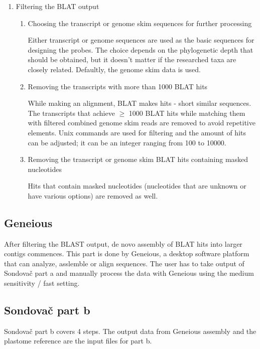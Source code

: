 \begin{enumerate}
\begin{enumerate}
\item Filtering the BLAT output

\begin{enumerate}
\item Choosing the transcript or genome skim sequences for further processing

Either transcript or genome sequences are used as the basic sequences for designing the probes. The choice depends on the phylogenetic depth that should be obtained, but it doesn't 
matter if the researched taxa are closely related. Defaultly, the genome skim data is used. 

\item Removing the transcripts with more than 1000 BLAT hits

While making an alignment, BLAT makes hits - short similar sequences. The transcripts that achieve $\geq$ 1000 BLAT hits while matching them with filtered 
combined genome skim reads are removed to avoid repetitive elements. Unix commands are used for filtering and the amount of hits can be adjusted; it can be an 
integer ranging from 100 to 10000. 

\item Removing the transcript or genome skim BLAT hits containing masked nucleotides

Hits that contain masked nucleotides (nucleotides that are unknown or have various options) are removed as well. 

\end{enumerate}
\end{enumerate}


\subsection{Geneious}

After filtering the BLAST output, de novo assembly of BLAT hits into larger contigs commences. This part is done by Geneious, a desktop software platform 
that can analyze, asslemble or align sequences. The user has to take output of Sondovač part a and manually process the data with Geneious using the medium 
sensitivity / fast setting. 

\subsection{Sondovač part b}
Sondovač part b covers 4 steps. The output data from Geneious assembly and the plastome reference are the input files for part b. 
  

\end{enumerate}

